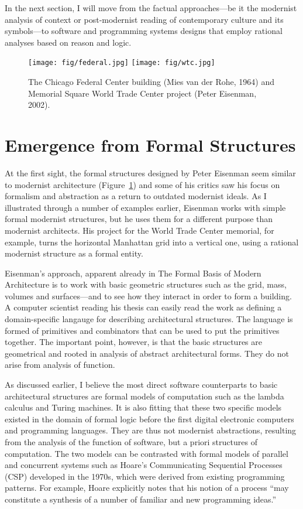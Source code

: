 In the next section, I will move from the factual approaches---be it the modernist analysis
of context or post-modernist reading of contemporary culture and its symbols---to software and
programming systems designs that employ rational analyses based on reason and logic.

\begin{figure}
\centering
\texttt{[image: fig/federal.jpg]}\quad
\texttt{[image: fig/wtc.jpg]}
\caption{The Chicago Federal Center building (Mies van der Rohe, 1964) and Memorial Square World Trade
Center project (Peter Eisenman, 2002).}
\label{fig:wtc}
\end{figure}

\section{Emergence from Formal Structures}
At the first sight, the formal structures designed by Peter Eisenman seem similar to modernist
architecture (Figure~\ref{fig:wtc}) and some of his critics saw his focus on formalism and
abstraction as a return to outdated modernist ideals. As I illustrated through a number of examples
earlier, Eisenman works with simple formal modernist structures, but he uses them for a different
purpose than modernist architects. His project for the World Trade Center memorial, for
example, turns the horizontal Manhattan grid into a vertical one, using a rational modernist
structure as a formal entity.

Eisenman's approach, apparent already in The Formal Basis of Modern Architecture is to work
with basic geometric structures such as the grid, mass, volumes and surfaces---and to see how
they interact in order to form a building. A computer scientist reading his thesis can easily
read the work as defining a domain-specific langauge for describing architectural structures.
The language is formed of primitives and combinators that can be used to put the primitives
together. The important point, however, is that the basic structures are geometrical and rooted
in analysis of abstract architectural forms. They do not arise from analysis of function.

As discussed earlier, I believe the most direct software counterparts to basic architectural
structures are formal models of computation such as the lambda calculus and Turing machines.
It is also fitting that these two specific models existed in the domain of formal logic before
the first digital electronic computers and programming languages. They are thus not modernist
abstractions, resulting from the analysis of the function of software, but a priori structures
of computation. The two models can be contrasted with formal models of parallel and concurrent
systems such as Hoare's Communicating Sequential Processes (CSP) developed in the
1970s,
which were derived from existing programming patterns. For example, Hoare explicitly notes
that his notion of a process ``may constitute a synthesis of a number of familiar and new
programming ideas.''

